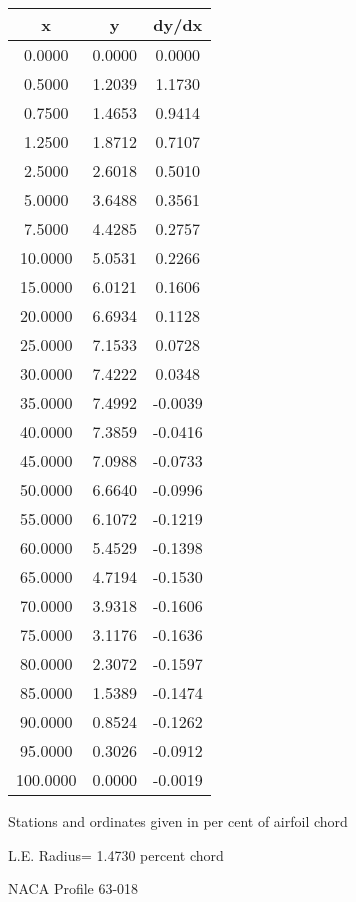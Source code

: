 \documentclass[11pt]{book}
\begin{document}
 \vspace{8mm}
 \begin{tabular}{|c|c|c|} \hline 
  x  &  y  &  dy/dx \\
 \hline
0.0000 & 0.0000 & 0.0000 \\
0.5000 & 1.2039 & 1.1730 \\
0.7500 & 1.4653 & 0.9414 \\
1.2500 & 1.8712 & 0.7107 \\
2.5000 & 2.6018 & 0.5010 \\
5.0000 & 3.6488 & 0.3561 \\
7.5000 & 4.4285 & 0.2757 \\
10.0000 & 5.0531 & 0.2266 \\
15.0000 & 6.0121 & 0.1606 \\
20.0000 & 6.6934 & 0.1128 \\
25.0000 & 7.1533 & 0.0728 \\
30.0000 & 7.4222 & 0.0348 \\
35.0000 & 7.4992 & -0.0039 \\
40.0000 & 7.3859 & -0.0416 \\
45.0000 & 7.0988 & -0.0733 \\
50.0000 & 6.6640 & -0.0996 \\
55.0000 & 6.1072 & -0.1219 \\
60.0000 & 5.4529 & -0.1398 \\
65.0000 & 4.7194 & -0.1530 \\
70.0000 & 3.9318 & -0.1606 \\
75.0000 & 3.1176 & -0.1636 \\
80.0000 & 2.3072 & -0.1597 \\
85.0000 & 1.5389 & -0.1474 \\
90.0000 & 0.8524 & -0.1262 \\
95.0000 & 0.3026 & -0.0912 \\
100.0000 & 0.0000 & -0.0019 \\
 \hline
 \end{tabular}
 \vspace{8mm}


Stations and ordinates given in per cent of airfoil chord 


L.E. Radius=  1.4730 percent chord
 \newpage
  \label{p63-018}
 \begin{Large}
 NACA Profile 63-018
 \end{Large}
  
\end{document}
